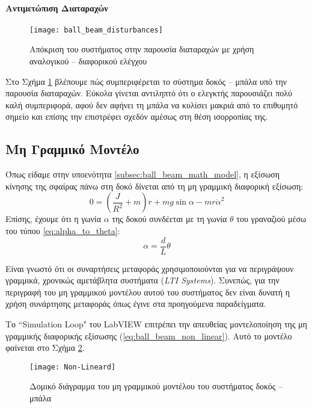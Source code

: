 \paragraph{Αντιμετώπιση Διαταραχών} \label{par:disturbances}\hfill

\begin{figure}[h]
  \centering
  \texttt{[image: ball\_beam\_disturbances]}
  \caption{Απόκριση του συστήματος στην παρουσία διαταραχών με χρήση αναλογικού -- διαφορικού ελέγχου}
  \label{fig:ball_beam_disturbances}
\end{figure}

Στο Σχήμα \ref{fig:ball_beam_disturbances} βλέπουμε πώς συμπεριφέρεται το σύστημα δοκός -- μπάλα υπό την παρουσία διαταραχών. Εύκολα γίνεται αντιληπτό ότι ο ελεγκτής παρουσιάζει πολύ καλή συμπεριφορά, αφού δεν αφήνει τη μπάλα να κυλίσει μακριά από το επιθυμητό σημείο και επίσης την επιστρέφει σχεδόν αμέσως στη θέση ισορροπίας της.

\subsection{Μη Γραμμικό Μοντέλο}

Όπως είδαμε στην υποενότητα \ref{subsec:ball_beam_math_model}, η εξίσωση κίνησης της σφαίρας πάνω στη δοκό δίνεται από τη μη γραμμική διαφορική εξίσωση:
\begin{equation*}
0 = \left(\frac{J}{R^2}+m\right)\ddot{r}+mg\sin\alpha - mr\dot{\alpha}^2
\end{equation*}
Επίσης, έχουμε ότι η γωνία $\alpha$ της δοκού συνδέεται με τη γωνία $\theta$ του γραναζιού μέσω του τύπου \ref{eq:alpha_to_theta}:
\begin{equation*}
\alpha = \frac{d}{L}\theta
\end{equation*}

Είναι γνωστό ότι οι συναρτήσεις μεταφοράς χρησιμοποιούνται για να περιγράψουν γραμμικά, χρονικώς αμετάβλητα συστήματα (\emph{LTI Systems}). Συνεπώς, για την περιγραφή του μη γραμμικού μοντέλου αυτού του συστήματος δεν είναι δυνατή η χρήση συνάρτησης μεταφοράς όπως έγινε στα προηγούμενα παραδείγματα.

Το ``Simulation Loop" του LabVIEW επιτρέπει την απευθείας μοντελοποίηση της μη γραμμικής διαφορικής εξίσωσης (\ref{eq:ball_beam_non_linear}). Αυτό το μοντέλο φαίνεται στο Σχήμα \ref{fig:Non-Lineard}.

\begin{figure}[h]
  \centering
  \texttt{[image: Non-Lineard]}
  \caption{Δομικό διάγραμμα του μη γραμμικού μοντέλου του συστήματος δοκός -- μπάλα}
  \label{fig:Non-Lineard}
\end{figure}

